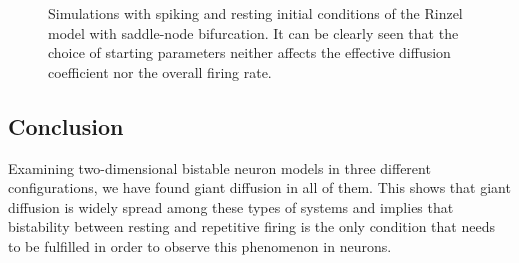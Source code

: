 \documentclass[12pt,a4paper]{article}
\begin{document}
\begin{figure}[H]
	\hspace*{-0.5cm}
	\caption{Simulations with spiking and resting initial conditions of the Rinzel model with saddle-node bifurcation. It can be clearly seen that the choice of starting parameters neither affects the effective diffusion coefficient nor the overall firing rate.}
	\label{icrinzel}
\end{figure}
\subsection{Conclusion}
Examining two-dimensional bistable neuron models in three different configurations, we have found giant diffusion in all of them. This shows that giant diffusion is widely spread among these types of systems and implies that bistability between resting and repetitive firing is the only condition that needs to be fulfilled in order to observe this phenomenon in neurons.
\newpage
\end{document}
